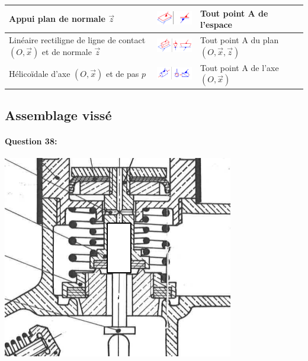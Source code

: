 \begin{center}
\begin{tabular}{|P{3cm}|P{3cm}|P{2cm}|P{2.5cm}|P{2.5cm}|}
\hline
Appui plan de normale $\overrightarrow{z}$ & \vspace{0.5pt} \includegraphics[width=3cm]{img/rep10} & Tout point A de l'espace & & \\
\hline
Linéaire rectiligne de ligne de contact $(O,\overrightarrow{x})$ et de normale $\overrightarrow{z}$& \vspace{0.5pt} \includegraphics[width=3cm]{img/rep11} & Tout point A du plan $(O,\overrightarrow{x},\overrightarrow{z})$ & & \\
\hline
Hélicoïdale d'axe $(O,\overrightarrow{x})$ et de pas $p$ & \vspace{0.5pt} \includegraphics[width=3cm]{img/rep12} & Tout point A de l'axe $(O,\overrightarrow{x})$ & & \\
\hline
\end{tabular}
\end{center}

\reponse[3]

\newpage

\subsection{Assemblage vissé}

\paragraph{Question 38:}

\begin{center}
 \includegraphics[width=0.8\linewidth]{img/zoom_lance}
\end{center}

